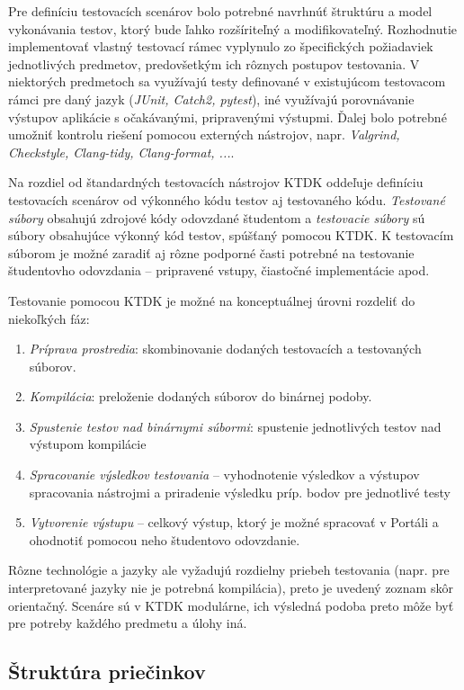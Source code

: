 \documentclass[
  digital, %
  oneside, %
  table,   %
  lof,     %
  lot,   %
]{fithesis3}
\begin{document}
Pre definíciu testovacích scenárov bolo potrebné navrhnúť štruktúru a model vykonávania testov, ktorý bude ľahko rozšíriteľný a modifikovateľný. Rozhodnutie implementovať vlastný testovací rámec vyplynulo zo špecifických požiadaviek jednotlivých predmetov, predovšetkým ich rôznych postupov testovania. V niektorých predmetoch sa využívajú testy definované v existujúcom testovacom rámci pre daný jazyk (\emph{JUnit, Catch2, pytest}), iné využívajú porovnávanie výstupov aplikácie s očakávanými, pripravenými výstupmi. Ďalej bolo potrebné umožniť kontrolu riešení pomocou externých nástrojov, napr. \emph{Valgrind, Checkstyle, Clang-tidy, Clang-format, ...}.

Na rozdiel od štandardných testovacích nástrojov KTDK oddeľuje definíciu testovacích scenárov od výkonného kódu testov aj testovaného kódu. \emph{Testované súbory} obsahujú zdrojové kódy odovzdané študentom a \emph{testovacie súbory} sú súbory obsahujúce výkonný kód testov, spúšťaný pomocou KTDK. K testovacím súborom je možné zaradiť aj rôzne podporné časti potrebné na testovanie študentovho odovzdania -- pripravené vstupy, čiastočné implementácie apod.

Testovanie pomocou KTDK je možné na konceptuálnej úrovni rozdeliť do niekoľkých fáz:
\begin{enumerate}
    \item \emph{Príprava prostredia}: skombinovanie dodaných testovacích a testovaných súborov.
    \item \emph{Kompilácia}: preloženie dodaných súborov do binárnej podoby.
    \item \emph{Spustenie testov nad binárnymi súbormi}: spustenie jednotlivých testov nad výstupom kompilácie
    \item \emph{Spracovanie výsledkov testovania} -- vyhodnotenie výsledkov a výstupov spracovania nástrojmi a priradenie výsledku príp. bodov pre jednotlivé testy
    \item \emph{Vytvorenie výstupu} -- celkový výstup, ktorý je možné spracovať v Portáli a ohodnotiť pomocou neho študentovo odovzdanie.
\end{enumerate}

Rôzne technológie a jazyky ale vyžadujú rozdielny priebeh testovania (napr. pre interpretované jazyky nie je potrebná kompilácia), preto je uvedený zoznam skôr orientačný. Scenáre sú v KTDK modulárne, ich výsledná podoba preto môže byť pre potreby každého predmetu a úlohy iná. 

\subsection{Štruktúra priečinkov}
\end{document}
